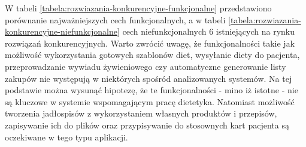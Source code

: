 W tabeli \ref{tabela:rozwiazania-konkurencyjne-funkcjonalne} przedstawiono porównanie najważniejszych cech funkcjonalnych, a w tabeli \ref{tabela:rozwiazania-konkurencyjne-niefunkcjonalne} cech niefunkcjonalnych 6 istniejących na rynku rozwiązań konkurencyjnych.
Warto zwrócić uwagę, że funkcjonalności takie jak możliwość wykorzystania gotowych szablonów diet, wysyłanie diety do pacjenta, przeprowadzanie wywiadu żywieniowego czy automatyczne generowanie listy zakupów nie występują w niektórych spośród analizowanych systemów.
Na tej podstawie można wysunąć hipotezę, że te funkcjonalności - mino iż istotne - nie są kluczowe w systemie wspomagającym pracę dietetyka.
Natomiast możliwość tworzenia jadłospisów z wykorzystaniem własnych produktów i przepisów, zapisywanie ich do plików oraz przypisywanie do stosownych kart pacjenta są oczekiwane w tego typu aplikacji.

